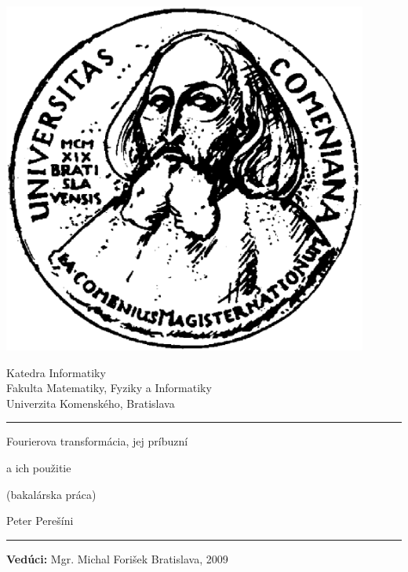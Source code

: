 \documentclass[12pt]{book}
\title{\mytitle}
\author{\myname}
\date{}
\def\mytitleone{Fourierova transformácia, jej príbuzní}
\def\mytitletwo{a ich použitie}
\def\myname{Peter Perešíni}
\def\myleader{Mgr. Michal Forišek}
\begin{document}
\frontmatter

\thispagestyle{empty}

\begin{minipage}{0.25\textwidth}
\includegraphics[width=0.9\textwidth]{komlogo}
\end{minipage}
\begin{minipage}{0.69\textwidth}
\begin{center}
\sc Katedra Informatiky \\
Fakulta Matematiky, Fyziky a Informatiky \\
Univerzita Komenského, Bratislava
\end{center}
\end{minipage}

\vfill
\begin{center}
\begin{minipage}{0.8\textwidth}
\hrule
\bigskip\bigskip
\centerline{\LARGE\sc \mytitleone}
\bigskip
\centerline{\LARGE\sc \mytitletwo}
\smallskip
\centerline{(bakalárska práca)}
\bigskip
\bigskip
\centerline{\large\sc \myname}
\bigskip\bigskip
\hrule
\end{minipage}
\end{center}
\vfill
{\bf Vedúci:} \myleader
\hfill Bratislava, 2009
\eject %

\pagecolor{white}
\thispagestyle{empty}~\vfill\eject %

{~}\vspace{12cm}
\end{document}
